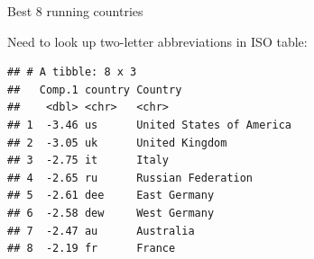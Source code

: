 \documentclass[
  ignorenonframetext,
]{beamer}
\newenvironment{Shaded}{\begin{snugshade}}{\end{snugshade}}
\newcommand{\DataTypeTok}[1]{\textcolor[rgb]{0.13,0.29,0.53}{#1}}
\newcommand{\DecValTok}[1]{\textcolor[rgb]{0.00,0.00,0.81}{#1}}
\newcommand{\FloatTok}[1]{\textcolor[rgb]{0.00,0.00,0.81}{#1}}
\newcommand{\KeywordTok}[1]{\textcolor[rgb]{0.13,0.29,0.53}{\textbf{#1}}}
\newcommand{\NormalTok}[1]{#1}
\newcommand{\OperatorTok}[1]{\textcolor[rgb]{0.81,0.36,0.00}{\textbf{#1}}}
\newcommand{\StringTok}[1]{\textcolor[rgb]{0.31,0.60,0.02}{#1}}
\begin{document}
\begin{frame}[fragile]{Best 8 running countries}
\protect\hypertarget{best-8-running-countries}{}

Need to look up two-letter abbreviations in ISO table:

\footnotesize

\begin{Shaded}
\end{Shaded}

\begin{verbatim}
## # A tibble: 8 x 3
##   Comp.1 country Country                 
##    <dbl> <chr>   <chr>                   
## 1  -3.46 us      United States of America
## 2  -3.05 uk      United Kingdom          
## 3  -2.75 it      Italy                   
## 4  -2.65 ru      Russian Federation      
## 5  -2.61 dee     East Germany            
## 6  -2.58 dew     West Germany            
## 7  -2.47 au      Australia               
## 8  -2.19 fr      France
\end{verbatim}

\normalsize

\end{frame}
\end{document}
